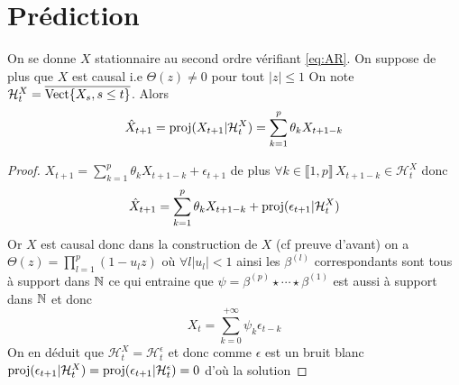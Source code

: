 \documentclass{report}
\begin{document}
\section{Prédiction}
\begin{Prop}
On se donne $X$ stationnaire au second ordre vérifiant \eqref{eq:AR}. On suppose de plus que $X$ est causal i.e $\Theta(z) \neq 0$ pour tout $|z| \leq 1$
On note $\mathcal{H}_t^X = \overline{\mathrm{Vect}{ \left\lbrace X_s, s\leq t \right\rbrace }}$. Alors
\[ \hat{X}_{t+1} = \mathop{\rm proj}\nolimits(X_{t+1} | \mathcal{H}_t^X ) = \sum_{k=1}^p \theta_k X_{t+1-k} \]
\end{Prop}
\begin{proof}
$X_{t+1} = \sum_{k=1}^p \theta_k X_{t+1-k} +\epsilon_{t+1}$ de plus $\forall k \in \llbracket 1,p \rrbracket \, X_{t+1-k} \in \mathcal{H}_t^X$ donc
\[ \hat{X}_{t+1} = \sum_{k=1}^p \theta_k X_{t+1-k} + \mathop{\rm proj}\nolimits(\epsilon_{t+1} | \mathcal{H}_t^X ) \]
Or $X$ est causal donc dans la construction de $X$ (cf preuve d'avant) on a $\Theta(z)= \prod_{l=1}^p (1-u_l z)$ où $\forall l |u_l|<1$ ainsi les $\beta^{(l)}$ correspondants sont tous à support dans $\mathbb{N}$ ce qui entraine que $\psi = \beta^{(p)} \star \cdots \star \beta^{(1)}$ est aussi à support dans $\mathbb{N}$ et donc 
\[ X_t = \sum_{k=0}^{+\infty} \psi_k \epsilon_{t-k}\] On en déduit que $\mathcal{H}_t^X = \mathcal{H}_t^\epsilon$ et donc comme $\epsilon$ est un bruit blanc $\mathop{\rm proj}\nolimits(\epsilon_{t+1} | \mathcal{H}_t^X ) = \mathop{\rm proj}\nolimits(\epsilon_{t+1} | \mathcal{H}_t^\epsilon ) = 0$ d'où la solution
\end{proof}
\end{document}
